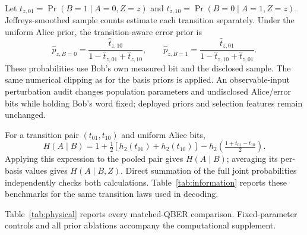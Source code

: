 Let $t_{z,01}=\Pr(B=1\mid A=0,Z=z)$ and
$t_{z,10}=\Pr(B=0\mid A=1,Z=z)$. Jeffreys-smoothed sample counts estimate each
transition separately. Under the uniform Alice prior, the transition-aware error prior is
\begin{equation}
 \widehat p_{z,B=0}=\frac{\widehat t_{z,10}}
 {1-\widehat t_{z,01}+\widehat t_{z,10}},\qquad
 \widehat p_{z,B=1}=\frac{\widehat t_{z,01}}
 {1-\widehat t_{z,10}+\widehat t_{z,01}}.
\end{equation}
These probabilities use Bob's own measured bit and the disclosed sample. The same
numerical clipping as for the basis priors is applied. An observable-input perturbation
audit changes population parameters and undisclosed Alice/error bits while holding Bob's
word fixed; deployed priors and selection features remain unchanged.

For a transition pair $(t_{01},t_{10})$ and uniform Alice bits,
\begin{equation}
 H(A\mid B)=1+\tfrac12[h_2(t_{01})+h_2(t_{10})]
 -h_2\!\left(\tfrac{1+t_{01}-t_{10}}2\right).
\end{equation}
Applying this expression to the pooled pair gives $H(A\mid B)$; averaging its
per-basis values gives $H(A\mid B,Z)$. Direct summation of the full joint
probabilities independently checks both calculations. Table~\ref{tab:information}
reports these benchmarks for the same transition laws used in decoding.


Table~\ref{tab:physical} reports every matched-QBER comparison. Fixed-parameter
controls and all prior ablations accompany the computational supplement.

